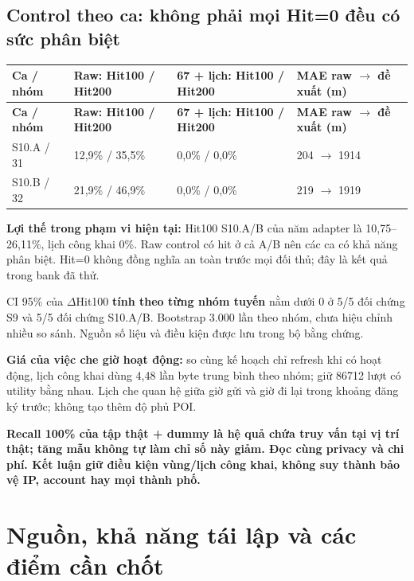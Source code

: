 \documentclass[10pt,a4paper]{article}
\newcommand{\key}[1]{\par\smallskip\noindent\colorbox{pale}{\parbox{\dimexpr\linewidth-2\fboxsep}{\textbf{#1}}}\par\smallskip}
\begin{document}
\subsection{Control theo ca: không phải mọi Hit=0 đều có sức phân biệt}
\begingroup\small
\begin{longtable}{@{}P{2.420cm}P{4.065cm}P{4.549cm}P{5.323cm}@{}}
\toprule
\textbf{Ca / nhóm} & \textbf{Raw: Hit100 / Hit200} & \textbf{67 + lịch: Hit100 / Hit200} & \textbf{MAE raw $\to$ đề xuất (m)}\\\midrule
\endfirsthead
\toprule
\textbf{Ca / nhóm} & \textbf{Raw: Hit100 / Hit200} & \textbf{67 + lịch: Hit100 / Hit200} & \textbf{MAE raw $\to$ đề xuất (m)}\\\midrule
\endhead
\bottomrule\endfoot
S10.A / 31 & 12,9\% / 35,5\% & 0,0\% / 0,0\% & 204 $\to$ 1914\\
\addlinespace[3pt]
S10.B / 32 & 21,9\% / 46,9\% & 0,0\% / 0,0\% & 219 $\to$ 1919\\
\end{longtable}
\endgroup
\textbf{Lợi thế trong phạm vi hiện tại:} Hit100 S10.A/B của năm adapter là 10,75–26,11\%, lịch công khai 0\%. Raw control có hit ở cả A/B nên các ca có khả năng phân biệt. Hit=0 không đồng nghĩa an toàn trước mọi đối thủ; đây là kết quả trong bank đã thử.

CI 95\% của $\Delta$Hit100 \textbf{tính theo từng nhóm tuyến} nằm dưới 0 ở 5/5 đối chứng S9 và 5/5 đối chứng S10.A/B. Bootstrap 3.000 lần theo nhóm, chưa hiệu chỉnh nhiều so sánh. Nguồn số liệu và điều kiện được lưu trong bộ bằng chứng.

\textbf{Giá của việc che giờ hoạt động:} so cùng kế hoạch chỉ refresh khi có hoạt động, lịch công khai dùng 4,48 lần byte trung bình theo nhóm; giữ 86712 lượt có utility bằng nhau. Lịch che quan hệ giữa giờ gửi và giờ đi lại trong khoảng đăng ký trước; không tạo thêm độ phủ POI.

\key{Recall 100\% của tập thật + dummy là hệ quả chứa truy vấn tại vị trí thật; tăng mẫu không tự làm chỉ số này giảm. Đọc cùng privacy và chi phí. Kết luận giữ điều kiện vùng/lịch công khai, không suy thành bảo vệ IP, account hay mọi thành phố.}


\clearpage
\section{Nguồn, khả năng tái lập và các điểm cần chốt}
\end{document}
